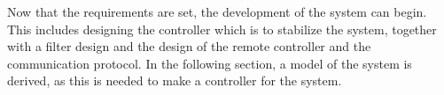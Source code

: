 Now that the requirements are set, the development of the system can begin. This includes designing the controller which is to stabilize the system, together with a filter design and the design of the remote controller and the communication protocol. In the following section, a model of the system is derived, as this is needed to make a controller for the system.
%
